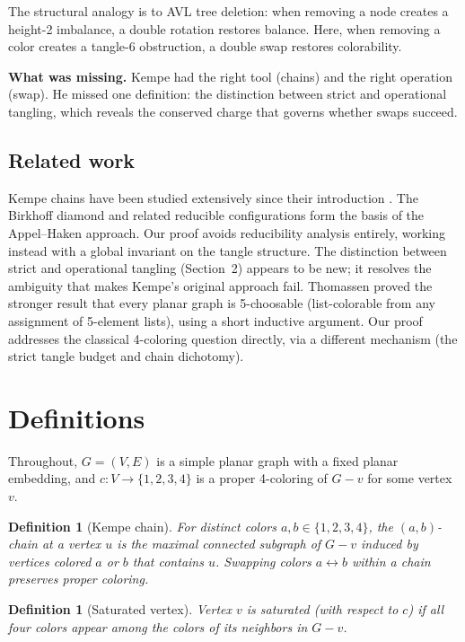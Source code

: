 \documentclass[11pt]{article}
\newtheorem{definition}[theorem]{Definition}
\theoremstyle{remark}
\begin{document}
The structural analogy is to AVL tree deletion: when removing a node creates a height-2 imbalance, a double rotation restores balance. Here, when removing a color creates a tangle-6 obstruction, a double swap restores colorability.

\medskip
\noindent\textbf{What was missing.} Kempe had the right tool (chains) and the right operation (swap). He missed one definition: the distinction between strict and operational tangling, which reveals the conserved charge that governs whether swaps succeed.

\subsection{Related work}

Kempe chains have been studied extensively since their introduction \cite{kempe1879}. The Birkhoff diamond \cite{birkhoff1913} and related reducible configurations form the basis of the Appel--Haken approach. Our proof avoids reducibility analysis entirely, working instead with a global invariant on the tangle structure. The distinction between strict and operational tangling (Section~2) appears to be new; it resolves the ambiguity that makes Kempe's original approach fail. Thomassen \cite{thomassen1994} proved the stronger result that every planar graph is 5-choosable (list-colorable from any assignment of 5-element lists), using a short inductive argument. Our proof addresses the classical 4-coloring question directly, via a different mechanism (the strict tangle budget and chain dichotomy).

\section{Definitions}

Throughout, $G = (V, E)$ is a simple planar graph with a fixed planar embedding, and $c : V \to \{1, 2, 3, 4\}$ is a proper 4-coloring of $G - v$ for some vertex $v$.

\begin{definition}[Kempe chain]
For distinct colors $a, b \in \{1,2,3,4\}$, the \emph{$(a,b)$-chain} at a vertex $u$ is the maximal connected subgraph of $G - v$ induced by vertices colored $a$ or $b$ that contains $u$. Swapping colors $a \leftrightarrow b$ within a chain preserves proper coloring.
\end{definition}

\begin{definition}[Saturated vertex]
Vertex $v$ is \emph{saturated} (with respect to $c$) if all four colors appear among the colors of its neighbors in $G - v$.
\end{definition}
\end{document}
